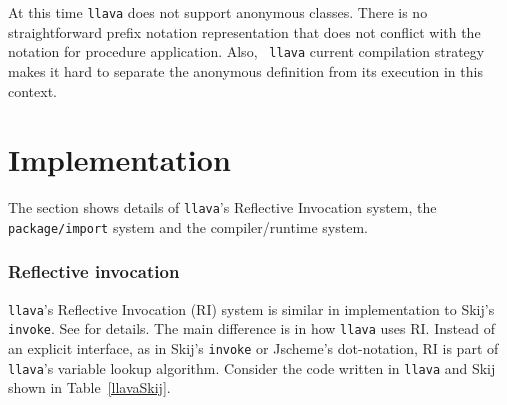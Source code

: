\documentclass{acm-final/sig-alternate-modified}
\begin{document}
At this time {\tt llava} does not support anonymous classes.  There is
no straightforward prefix notation representation that does not
conflict with the notation for procedure application.  Also, {\tt
llava} current compilation strategy makes it hard to separate the
anonymous definition from its execution in this context.

\section{Implementation}

The section shows details of {\tt llava}'s Reflective Invocation
system, the {\tt package/import} system and the compiler/runtime
system.

\subsubsection{Reflective invocation}

{\tt llava}'s Reflective Invocation (RI) system is similar in
implementation to Skij's {\tt invoke}.  See \cite{skij1,skij2,skij3}
for details.  The main difference is in how {\tt llava} uses RI.
Instead of an explicit interface, as in Skij's {\tt invoke} or
Jscheme's dot-notation, RI is part of {\tt llava}'s variable lookup
algorithm.  Consider the code written in {\tt llava} and Skij shown in
Table~\ref{llavaSkij}.
\end{document}

